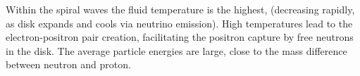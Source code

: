 
%
%
%
Within the spiral waves the fluid temperature is the highest,
(decreasing rapidly, as 
disk expands and cools via neutrino emission).
High temperatures lead to the electron-positron pair creation, 
facilitating the positron capture by free neutrons 
in the disk.
%
The average particle energies are large, close to the mass difference between neutron 
and proton. 
